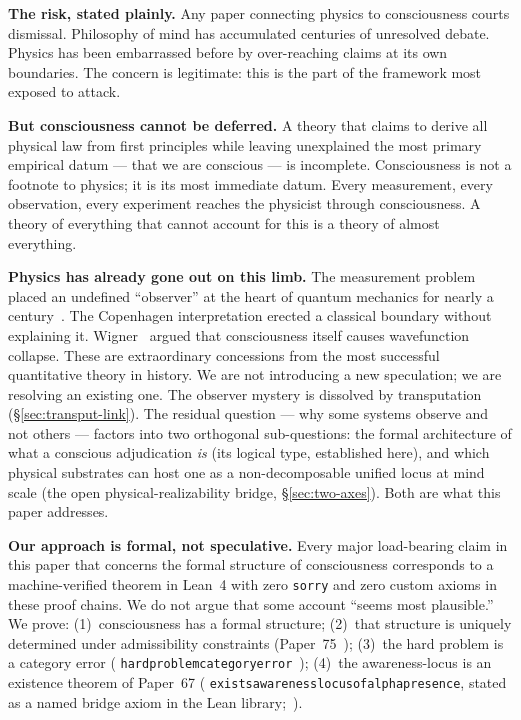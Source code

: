 \documentclass[11pt]{article}
\theoremstyle{remark}
\newcommand{\lean}[1]{%
  \penalty-100
  \begingroup\def\_{\textunderscore\allowbreak}\texttt{#1}\endgroup}
\begin{document}
\begin{tcolorbox}[colback=orange!4,colframe=orange!60!black,breakable,
  title={Why a physics paper must address consciousness}]
\small

\textbf{The risk, stated plainly.}
Any paper connecting physics to consciousness courts dismissal. Philosophy of mind has
accumulated centuries of unresolved debate. Physics has been embarrassed before by
over-reaching claims at its own boundaries. The concern is legitimate: this is the
part of the framework most exposed to attack.

\medskip
\textbf{But consciousness cannot be deferred.}
A theory that claims to derive all physical law from first principles while leaving
unexplained the most primary empirical datum --- that we are conscious --- is
incomplete. Consciousness is not a footnote to physics; it is its most immediate
datum. Every measurement, every observation, every experiment reaches the physicist
through consciousness. A theory of everything that cannot account for this is a theory
of almost everything.

\medskip
\textbf{Physics has already gone out on this limb.}
The measurement problem placed an undefined ``observer'' at the heart of quantum
mechanics for nearly a century~\cite{vonNeumann1955}. The Copenhagen interpretation
erected a classical boundary without explaining it. Wigner~\cite{Wigner1961} argued
that consciousness itself causes wavefunction collapse. These are extraordinary
concessions from the most successful quantitative theory in history. We are not
introducing a new speculation; we are resolving an existing one. The observer
mystery is dissolved by transputation (\S\ref{sec:transput-link}). The residual question
--- why some systems observe and not others --- factors into two orthogonal sub-questions:
the formal architecture of what a conscious adjudication \emph{is} (its logical type,
established here), and which physical substrates can host one as a non-decomposable
unified locus at mind scale (the open physical-realizability bridge,
\S\ref{sec:two-axes}). Both are what this paper addresses.

\medskip
\textbf{Our approach is formal, not speculative.}
Every major load-bearing claim in this paper that concerns the formal structure of
consciousness corresponds to a machine-verified theorem in Lean~4 with zero
\texttt{sorry} and zero custom axioms in these proof chains. We do not argue that some account ``seems
most plausible.'' We prove: (1)~consciousness has a formal structure; (2)~that
structure is uniquely determined under admissibility constraints
(Paper~75~\cite{SpivackNEMS75}); (3)~the hard problem is a category error
(\lean{hard\_problem\_category\_error}~\cite{SpivackNEMS55}); (4)~the awareness-locus
is an existence theorem of Paper~67 (\lean{exists\_awareness\_locus\allowbreak\_of\_alpha\_presence}, stated as a named bridge axiom in the Lean library;~\cite{SpivackNEMS67}).


\end{tcolorbox}
\end{document}
